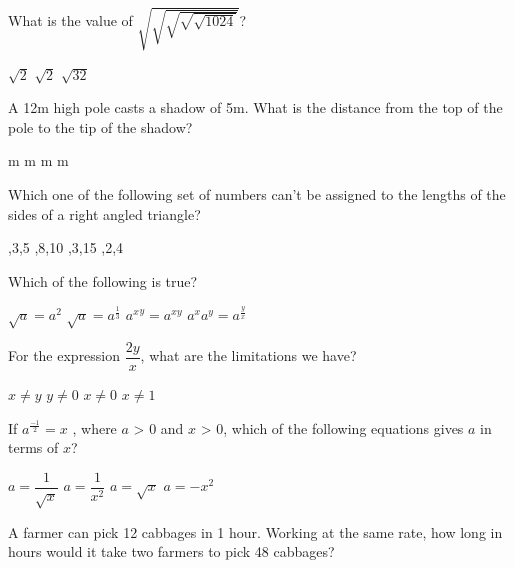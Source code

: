 \documentclass[12pt,addpoints]{exam}
\begin{document}
{{{\begin{questions}
					\question What is the value of $\sqrt{\sqrt{\sqrt{\sqrt{\sqrt{1024}}}}}$?\\
					\begin{oneparchoices}
						\choice $\sqrt{2}$
						$\sqrt{2}$
						\choice $\sqrt{32}$
					\end{oneparchoices}
					\question A 12m high pole casts a shadow of 5m. What is the distance from the top of the pole to the tip of the shadow? \\
					\begin{oneparchoices}
						\choice 12 m
						\choice 13 m
						\choice 5 m
						\choice 17 m
					\end{oneparchoices}	
					\question Which one of the following set of numbers can't be assigned to the lengths of the sides of a right angled triangle? \\
					\begin{oneparchoices}
						\choice 4,3,5
						\choice 6,8,10
						,3,15
						\choice 2,2,4
					\end{oneparchoices}
					\question Which of the following is true? \\
					\begin{oneparchoices}
						\choice $\sqrt{a}=a^{2}$
						\choice $\sqrt{a}=a^{\frac{1}{3}}$
						\choice ${a^{x}}^y=a^{xy}$
						\choice $a^xa^y=a^{\frac{y}{x}}$
					\end{oneparchoices}
					\question For the expression $\dfrac{2y}{x}$, what are the limitations we have? \\
					\begin{oneparchoices}
						\choice $x\not= y$
						\choice $y\not= 0$
						\choice $x\not= 0$
						\choice $x\not= 1$
					\end{oneparchoices}
					\question If $a^{\frac{-1}{2}}=x$ , where $a$ > 0 and $x$ > 0, which of the following equations gives $a$
					in terms of $x$? \\
					\begin{oneparchoices}
						\choice $a=\dfrac{1}{\sqrt{x}}$
						\choice $a=\dfrac{1}{x^2}$
						\choice $a=\sqrt{x}$
						\choice $a=-{x}^2$
					\end{oneparchoices}
					\question A farmer can pick 12 cabbages in 1 hour. Working at the
					same rate, how long in hours would it take two farmers to pick 48 cabbages?\\
					\begin{oneparchoices}
						\choice 1
						\choice 2
						\choice 6
						\choice 8

\end{oneparchoices}
\end{questions}}}}
\end{document}
